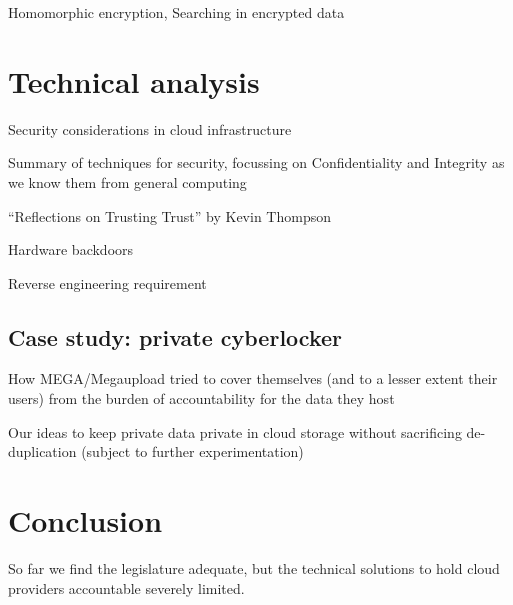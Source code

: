 \documentclass[11pt]{article}
\begin{document}
Homomorphic encryption,
Searching in encrypted data \cite{harrower2009searching, li2010fuzzy}

\section{Technical analysis}
Security considerations in cloud infrastructure

Summary of techniques for security, focussing on Confidentiality and Integrity as we know them from general computing

``Reflections on Trusting Trust'' by Kevin Thompson \cite{thompson1984reflections}

Hardware backdoors \cite{sparks2009chipset, duflot2010limits}

Reverse engineering requirement
\cite{rutkowska2008bluepilling}

\subsection{Case study: private cyberlocker}
How MEGA/Megaupload tried to cover themselves (and to a lesser extent their users) from the burden of accountability for the data they host

Our ideas to keep private data private in cloud storage without sacrificing de-duplication
(subject to further experimentation)


\section{Conclusion}
So far we find the legislature adequate, but the technical solutions to hold cloud providers accountable severely limited.


{}

\end{document}
